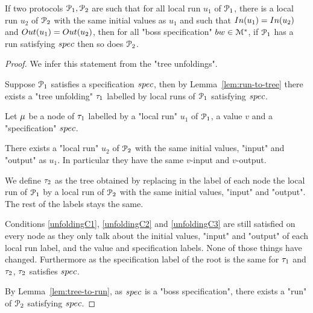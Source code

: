 \begin{lemma}
	\label{lem:local-to-global}
	If two protocols $\mathcal{P}_1, \mathcal{P}_2$ are such that for all local run $u_1$ of $\mathcal{P}_1$, there is a local run $u_2$ of $\mathcal{P}_2$ with the same initial values as $u_1$ and such that $\Input{u_1} = \Input{u_2}$ and $\Output{u_1} = \Output{u_2}$, then for all "boss specification" $bw \in \mathcal{M}^*$, if $\mathcal{P}_1$ has a run satisfying $\spec$ then so does $\mathcal{P}_2$.
\end{lemma}
\ifproofs
\begin{proof}
	We infer this statement from the "tree unfoldings".
	
	Suppose $\mathcal{P}_1$ satisfies a specification $\spec$, then by Lemma~\ref{lem:run-to-tree} there exists a "tree unfolding" $\tau_1$ labelled by local runs of $\mathcal{P}_1$ satisfying $\spec$. 
	
	Let $\mu$ be a node of $\tau_1$ labelled by a "local run" $u_1$ of $\mathcal{P}_1$, a value $v$ and a "specification" $\spec$.  
	
	There exists a "local run" $u_2$ of $\mathcal{P}_2$ with the same initial values, "input" and "output" as $u_1$. In particular they have the same $v$-input and $v$-output.
	
	We define $\tau_2$ as the tree obtained by replacing in the label of each node the local run of $\mathcal{P}_1$ by a local run of $\mathcal{P}_2$ with the same initial values, "input" and "output". The rest of the labels stays the same.
	
	Conditions \ref{unfoldingC1}, \ref{unfoldingC2} and \ref{unfoldingC3} are still satisfied on every node as they only talk about the initial values, "input" and "output" of each local run label, and the value and specification labels. None of those things have changed.
	Furthermore as the specification label of the root is the same for $\tau_1$ and $\tau_2$, $\tau_2$ satisfies $\spec$.
	
	By Lemma~\ref{lem:tree-to-run}, as $\spec$ is a "boss specification", there exists a "run" of $\mathcal{P}_2$ satisfying $\spec$.
\end{proof}
\fi


